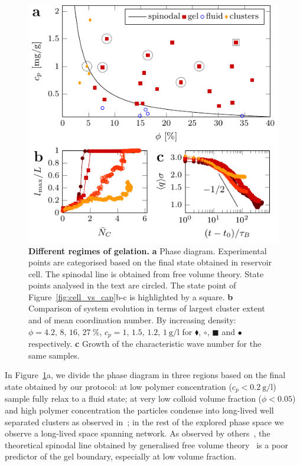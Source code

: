 \begin{figure}
\includegraphics{figs/phasediag.pdf}
\caption{\textbf{Different regimes of gelation.} \textbf{a} Phase diagram. Experimental points are categorised based on the final state obtained in reservoir cell. The spinodal line is obtained from free volume theory. State points analysed in the text are circled. The state point of Figure~\ref{fig:cell_vs_cap}b-c is highlighted by a square. \textbf{b} Comparison of system evolution in terms of largest cluster extent and of mean coordination number. By increasing density: $\phi=4.2,\,8,\,16,\,27~\%$, $c_p=1,\,1.5,\,1.2,\,\SI{1}{\gram\per\litre}$ for \textcolor{red!40!yellow}{$\blacklozenge$}, \textcolor{red!80!yellow}{$\circ$}, \textcolor{red!80!black}{\tiny$\blacksquare$} and \textcolor{red!40!black}{$\bullet$} respectively. \textbf{c} Growth of the characteristic wave number for the same samples.}
\label{fig:phasediag}
\end{figure}


In Figure~\ref{fig:phasediag}a, we divide the phase diagram in three regions based on the final state obtained by our protocol: at low polymer concentration ($c_p<\SI{0.2}{\gram\per\litre}$) sample fully relax to a fluid state; at very low colloid volume fraction ($\phi<0.05$) and high polymer concentration the particles condense into long-lived well separated clusters as observed in~\cite{Lu2006}; in the rest of the explored phase space we observe a long-lived space spanning network. As observed by others~\cite{Shah2003,Bergenholtz2003,lu2008gelation}, the theoretical spinodal line obtained by generalised free volume theory~\cite{Fleer2008} is a poor predictor of the gel boundary, especially at low volume fraction.




